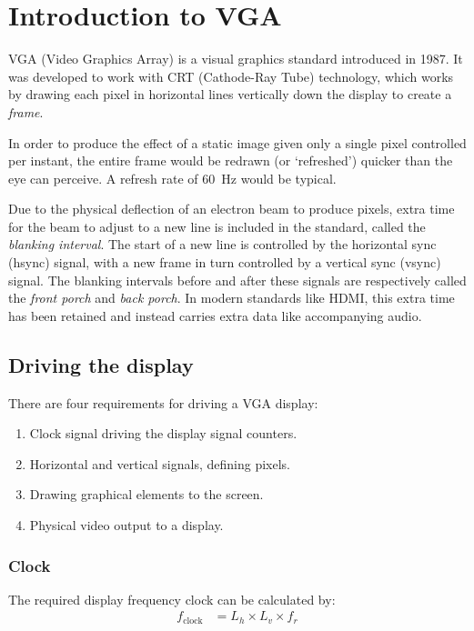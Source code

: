 \section{Introduction to VGA}\label{sec:intro}
VGA (Video Graphics Array) is a visual graphics standard introduced in 1987.
It was developed to work with CRT (Cathode-Ray Tube) technology, which works 
by drawing each pixel in horizontal lines vertically down the display to 
create a \emph{frame}.

In order to produce the effect of a static image 
given only a single pixel controlled per instant, the entire frame 
would be redrawn (or `refreshed') quicker than the eye can perceive.
A refresh rate of \qty{60}{\Hz} would be typical.

Due to the physical deflection of an electron beam to produce pixels, 
extra time for the beam to adjust to a new line is included in the standard, called 
the \emph{blanking interval}. 
The start of a new line is controlled by the horizontal sync (hsync) signal, with a 
new frame in turn controlled by a vertical sync (vsync) signal. The blanking intervals before 
and after these signals are respectively called the \emph{front porch} and \emph{back porch}. 
In modern standards like HDMI, this extra time has been retained and instead carries extra 
data like accompanying audio. 


\subsection{Driving the display}\label{sec:drivingdisplay}

There are four requirements for driving a VGA display:
\begin{enumerate}
    \item Clock signal driving the display signal counters.
    \item Horizontal and vertical signals, defining pixels.
    \item Drawing graphical elements to the screen.
    \item Physical video output to a display.
\end{enumerate}

\subsubsection{Clock}
The required display frequency clock can be calculated by:
\begin{align*}
    f_{\text{clock}} & = L_h \times L_v \times f_{r}
\end{align*}

